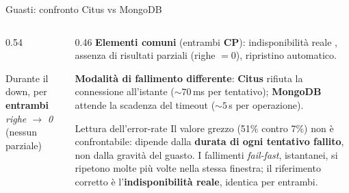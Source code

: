 \documentclass[aspectratio=169,11pt]{beamer}
\begin{document}
\begin{frame}{Guasti: confronto Citus vs MongoDB}
  \begin{columns}[c]
    \begin{column}{0.54\textwidth}
      \centering
      \\
      {\scriptsize\color{grigio}Durante il down, per \textbf{entrambi} \emph{righe $\to$ 0} (nessun parziale)}
    \end{column}
    \begin{column}{0.46\textwidth}
      \footnotesize
      \textbf{Elementi comuni} (entrambi \textbf{CP}): indisponibilità reale , assenza di
      risultati parziali (righe $=0$), ripristino automatico.
      \par\smallskip
      \textbf{Modalità di fallimento differente}: \textcolor{pgblu}{\textbf{Citus}} rifiuta la connessione
      all'istante (${\sim}70$\,ms per tentativo); \textcolor{mongoverde}{\textbf{MongoDB}} attende la scadenza
      del timeout (${\sim}5$\,s per operazione).
      \par\medskip
      \begin{keyblock}{Lettura dell'error-rate}
        \footnotesize Il valore grezzo (51\% contro 7\%) non è confrontabile: dipende dalla \textbf{durata di
        ogni tentativo fallito}, non dalla gravità del guasto. I fallimenti \emph{fail-fast}, istantanei, si
        ripetono molte più volte nella stessa finestra; il riferimento corretto è l'\textbf{indisponibilità
        reale}, identica per entrambi.
      \end{keyblock}
    \end{column}
  \end{columns}
\end{frame}
\end{document}
